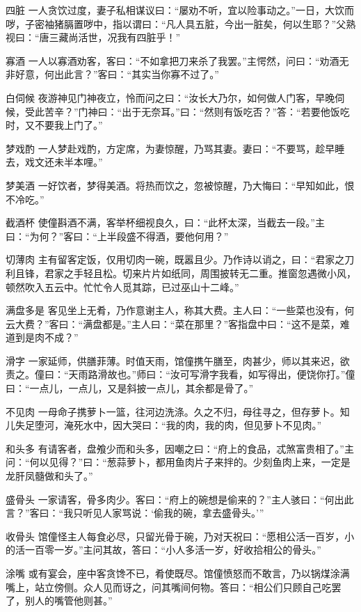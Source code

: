 \documentclass[12pt,UTF8]{ctexbook}
\begin{document}
四脏
一人贪饮过度，妻子私相谋议曰：“屡劝不听，宜以险事动之。”一日，大饮而哕，子密袖猪膈置哕中，指以谓曰：“凡人具五脏，今出一脏矣，何以生耶？”父熟视曰：“唐三藏尚活世，况我有四脏乎！”

寡酒
一人以寡酒劝客，客曰：“不如拿把刀来杀了我罢。”主愕然，问曰：“劝酒无非好意，何出此言？”客曰：“其实当你寡不过了。”

白伺候
夜游神见门神夜立，怜而问之曰：“汝长大乃尔，如何做人门客，早晚伺候，受此苦辛？”门神曰：“出于无奈耳。”曰：“然则有饭吃否？”答：“若要他饭吃时，又不要我上门了。”

梦戏酌
一人梦赴戏酌，方定席，为妻惊醒，乃骂其妻。妻曰：“不要骂，趁早睡去，戏文还未半本哩。”

梦美酒
一好饮者，梦得美酒。将热而饮之，忽被惊醒，乃大悔曰：“早知如此，恨不冷吃。”

截酒杯
使僮斟酒不满，客举杯细视良久，曰：“此杯太深，当截去一段。”主曰：“为何？”客曰：“上半段盛不得酒，要他何用？”

切薄肉
主有留客定饭，仅用切肉一碗，既嚣且少。乃作诗以诮之，曰：“君家之刀利且锋，君家之手轻且松。切来片片如纸同，周围披转无二重。推窗忽遇微小风，顿然吹入五云中。忙忙令人觅其踪，已过巫山十二峰。”

满盘多是
客见坐上无肴，乃作意谢主人，称其大费。主人曰：“一些菜也没有，何云大费？”客曰：“满盘都是。”主人曰：“菜在那里？”客指盘中曰：“这不是菜，难道到是肉不成？”

滑字
一家延师，供膳菲薄。时值天雨，馆僮携午膳至，肉甚少，师以其来迟，欲责之。僮曰：“天雨路滑故也。”师曰：“汝可写滑字我看，如写得出，便饶你打。”僮曰：“一点儿，一点儿，又是斜披一点儿，其余都是骨了。”

不见肉
一母命子携萝卜一篮，往河边洗涤。久之不归，母往寻之，但存萝卜。知儿失足堕河，淹死水中，因大哭曰：“我的肉，我的肉，但见萝卜不见肉。”

和头多
有请客者，盘飧少而和头多，因嘲之曰：“府上的食品，忒煞富贵相了。”主问：“何以见得？”曰：“葱蒜萝卜，都用鱼肉片子来拌的。少刻鱼肉上来，一定是龙肝凤髓做和头了。”

盛骨头
一家请客，骨多肉少。客曰：“府上的碗想是偷来的？”主人骇曰：“何出此言？”客曰：“我只听见人家骂说：‘偷我的碗，拿去盛骨头。’”

收骨头
馆僮怪主人每食必尽，只留光骨于碗，乃对天祝曰：“愿相公活一百岁，小的活一百零一岁。”主问其故，答曰：“小人多活一岁，好收拾相公的骨头。”

涂嘴
或有宴会，座中客贪馋不已，肴使既尽。馆僮愤怒而不敢言，乃以锅煤涂满嘴上，站立傍侧。众人见而讶之，问其嘴间何物。答曰：“相公们只顾自己吃罢了，别人的嘴管他则甚。”
\end{document}
